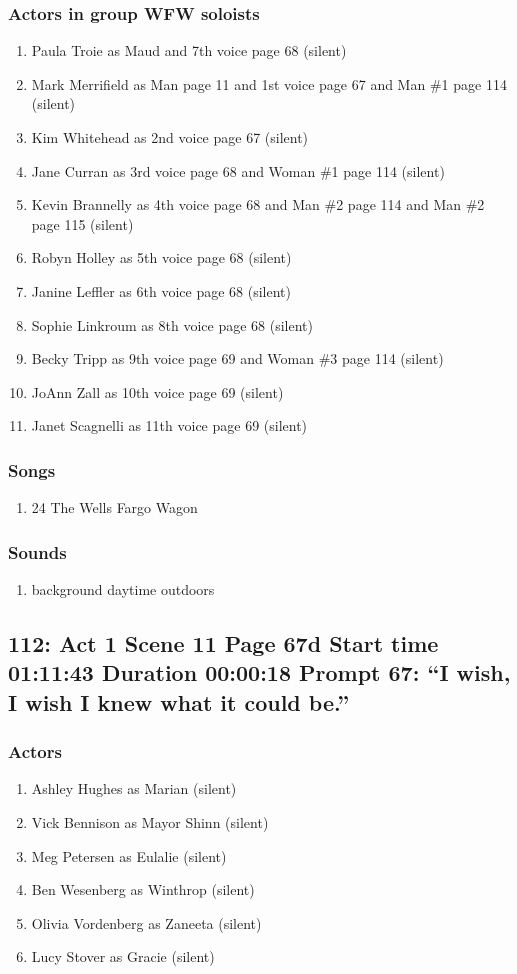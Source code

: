 \subsubsection{Actors in group WFW soloists}
\begin{enumerate}
\item Paula Troie as Maud and 7th voice page 68 (silent)
\item Mark Merrifield as Man page 11 and 1st voice page 67 and Man \#1 page 114 (silent)
\item Kim Whitehead as 2nd voice page 67 (silent)
\item Jane Curran as 3rd voice page 68 and Woman \#1 page 114 (silent)
\item Kevin Brannelly as 4th voice page 68 and Man \#2 page 114 and Man \#2 page 115 (silent)
\item Robyn Holley as 5th voice page 68 (silent)
\item Janine Leffler as 6th voice page 68 (silent)
\item Sophie Linkroum as 8th voice page 68 (silent)
\item Becky Tripp as 9th voice page 69 and Woman \#3 page 114 (silent)
\item JoAnn Zall as 10th voice page 69 (silent)
\item Janet Scagnelli as 11th voice page 69 (silent)
\end{enumerate}

\subsubsection{Songs}
\begin{enumerate}
\item 24 The Wells Fargo Wagon
\end{enumerate}\subsubsection{Sounds}
\begin{enumerate}
\item background daytime outdoors
\end{enumerate}
\subsection{112: Act 1 Scene 11 Page 67d Start time 01:11:43 Duration 00:00:18 Prompt 67: ``I wish, I wish I knew what it could be.''}

\subsubsection{Actors}
\begin{enumerate}
\item Ashley Hughes as Marian (silent)
\item Vick Bennison as Mayor Shinn (silent)
\item Meg Petersen as Eulalie (silent)
\item Ben Wesenberg as Winthrop (silent)
\item Olivia Vordenberg as Zaneeta (silent)
\item Lucy Stover as Gracie (silent)
\end{enumerate}
